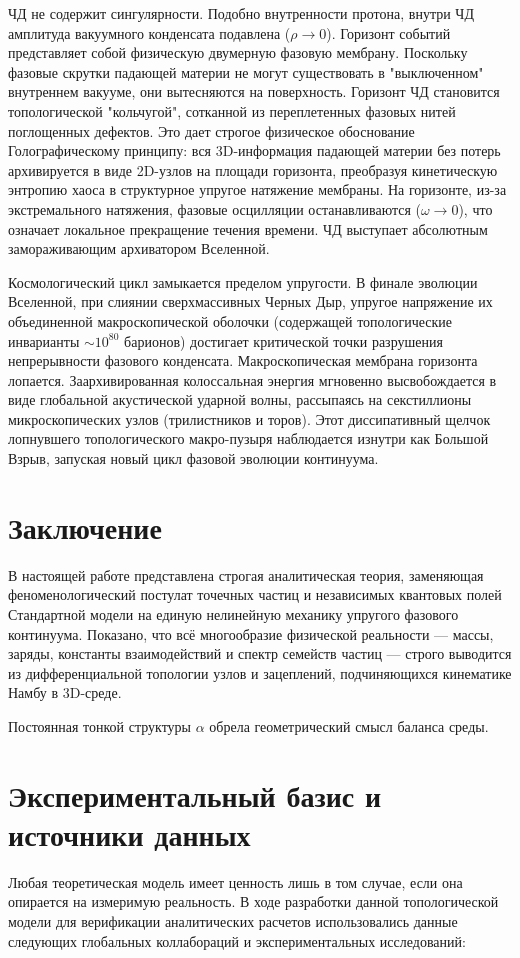 \documentclass[12pt,a4paper]{article}
\begin{document}
ЧД не содержит сингулярности. Подобно внутренности протона, внутри ЧД амплитуда вакуумного конденсата подавлена ($\rho \to 0$). Горизонт событий представляет собой физическую двумерную фазовую мембрану. Поскольку фазовые скрутки падающей материи не могут существовать в "выключенном" внутреннем вакууме, они вытесняются на поверхность. Горизонт ЧД становится топологической "кольчугой", сотканной из переплетенных фазовых нитей поглощенных дефектов. 
Это дает строгое физическое обоснование Голографическому принципу: вся 3D-информация падающей материи без потерь архивируется в виде 2D-узлов на площади горизонта, преобразуя кинетическую энтропию хаоса в структурное упругое натяжение мембраны. На горизонте, из-за экстремального натяжения, фазовые осцилляции останавливаются ($\omega \to 0$), что означает локальное прекращение течения времени. ЧД выступает абсолютным замораживающим архиватором Вселенной.

Космологический цикл замыкается пределом упругости. В финале эволюции Вселенной, при слиянии сверхмассивных Черных Дыр, упругое напряжение их объединенной макроскопической оболочки (содержащей топологические инварианты $\sim 10^{80}$ барионов) достигает критической точки разрушения непрерывности фазового конденсата. Макроскопическая мембрана горизонта лопается. Заархивированная колоссальная энергия мгновенно высвобождается в виде глобальной акустической ударной волны, рассыпаясь на секстиллионы микроскопических узлов (трилистников и торов). Этот диссипативный щелчок лопнувшего топологического макро-пузыря наблюдается изнутри как Большой Взрыв, запуская новый цикл фазовой эволюции континуума.

\section*{Заключение}

В настоящей работе представлена строгая аналитическая теория, заменяющая феноменологический постулат точечных частиц и независимых квантовых полей Стандартной модели на единую нелинейную механику упругого фазового континуума. 
Показано, что всё многообразие физической реальности — массы, заряды, константы взаимодействий и спектр семейств частиц — строго выводится из дифференциальной топологии узлов и зацеплений, подчиняющихся кинематике Намбу в 3D-среде. 

Постоянная тонкой структуры $\alpha$ обрела геометрический смысл баланса среды.

\section*{Экспериментальный базис и источники данных}
Любая теоретическая модель имеет ценность лишь в том случае, если она опирается на измеримую реальность. В ходе разработки данной топологической модели для верификации аналитических расчетов использовались данные следующих глобальных коллабораций и экспериментальных исследований:
\end{document}
